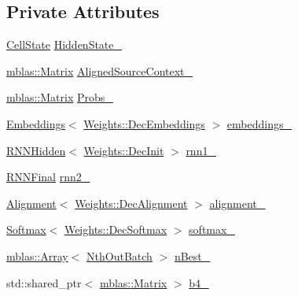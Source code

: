 \subsection*{Private Attributes}
\begin{DoxyCompactItemize}
\item 
\hyperlink{structamunmt_1_1GPU_1_1CellState}{Cell\+State} \hyperlink{classamunmt_1_1GPU_1_1Decoder_a7dde6f55a406e5029deefadb4ec4e721}{Hidden\+State\+\_\+}
\item 
\hyperlink{namespaceamunmt_1_1GPU_1_1mblas_ab67821a8254de53e45a623cf73c0aef6}{mblas\+::\+Matrix} \hyperlink{classamunmt_1_1GPU_1_1Decoder_af5bab1c2275d7e364107d32fb7b0bf88}{Aligned\+Source\+Context\+\_\+}
\item 
\hyperlink{namespaceamunmt_1_1GPU_1_1mblas_ab67821a8254de53e45a623cf73c0aef6}{mblas\+::\+Matrix} \hyperlink{classamunmt_1_1GPU_1_1Decoder_a2db7ea96ac662e863cc42d7b2c3bd935}{Probs\+\_\+}
\item 
\hyperlink{classamunmt_1_1GPU_1_1Decoder_1_1Embeddings}{Embeddings}$<$ \hyperlink{structamunmt_1_1GPU_1_1Weights_1_1DecEmbeddings}{Weights\+::\+Dec\+Embeddings} $>$ \hyperlink{classamunmt_1_1GPU_1_1Decoder_a05262f3f89bc3aec8cb5dbd4e695dbb7}{embeddings\+\_\+}
\item 
\hyperlink{classamunmt_1_1GPU_1_1Decoder_1_1RNNHidden}{R\+N\+N\+Hidden}$<$ \hyperlink{structamunmt_1_1GPU_1_1Weights_1_1DecInit}{Weights\+::\+Dec\+Init} $>$ \hyperlink{classamunmt_1_1GPU_1_1Decoder_ad7956fe0c4c077a501e171dd104a14af}{rnn1\+\_\+}
\item 
\hyperlink{classamunmt_1_1GPU_1_1Decoder_1_1RNNFinal}{R\+N\+N\+Final} \hyperlink{classamunmt_1_1GPU_1_1Decoder_a45258c2a114feb9570202953371256b4}{rnn2\+\_\+}
\item 
\hyperlink{classamunmt_1_1GPU_1_1Decoder_1_1Alignment}{Alignment}$<$ \hyperlink{structamunmt_1_1GPU_1_1Weights_1_1DecAlignment}{Weights\+::\+Dec\+Alignment} $>$ \hyperlink{classamunmt_1_1GPU_1_1Decoder_a019654e13f5f172611f6f960dd1fa0b5}{alignment\+\_\+}
\item 
\hyperlink{classamunmt_1_1GPU_1_1Decoder_1_1Softmax}{Softmax}$<$ \hyperlink{structamunmt_1_1GPU_1_1Weights_1_1DecSoftmax}{Weights\+::\+Dec\+Softmax} $>$ \hyperlink{classamunmt_1_1GPU_1_1Decoder_a355dd095e5d8da90692e31b8b3475fd8}{softmax\+\_\+}
\item 
\hyperlink{classamunmt_1_1GPU_1_1mblas_1_1Array}{mblas\+::\+Array}$<$ \hyperlink{structamunmt_1_1GPU_1_1NthOutBatch}{Nth\+Out\+Batch} $>$ \hyperlink{classamunmt_1_1GPU_1_1Decoder_a2c9298f8ba8046fcca15ff07be843cef}{n\+Best\+\_\+}
\item 
std\+::shared\+\_\+ptr$<$ \hyperlink{namespaceamunmt_1_1GPU_1_1mblas_ab67821a8254de53e45a623cf73c0aef6}{mblas\+::\+Matrix} $>$ \hyperlink{classamunmt_1_1GPU_1_1Decoder_a06b3ce95fed30df283a7044a8b95961d}{b4\+\_\+}
\end{DoxyCompactItemize}


